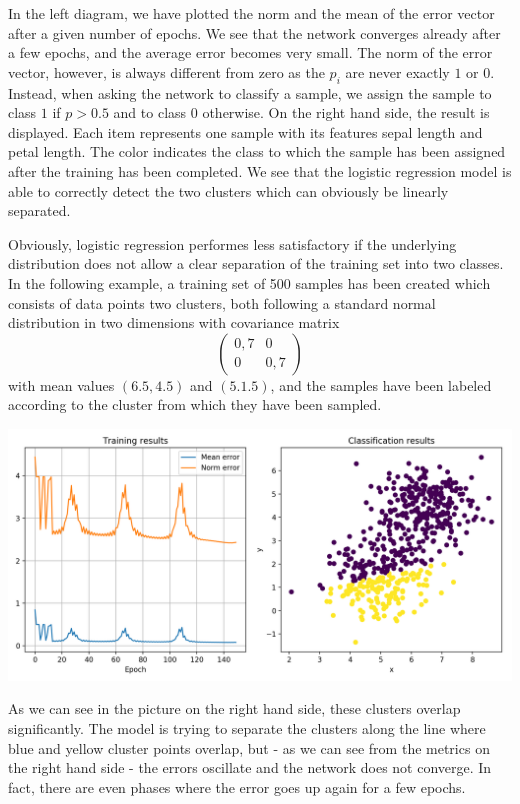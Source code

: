 \documentclass[a4paper, draft]{report}
\numberwithin{section}{chapter}
\numberwithin{equation}{chapter}
\theoremstyle{own}
\theoremstyle{remark}
\begin{document}
In the left diagram, we have plotted the norm and the mean of the error vector after a given number of epochs. We see that the network converges already after a few epochs, and the average error becomes very small. The norm of the error vector, however, is always different from zero
as the $p_i$ are never exactly $1$ or $0$. Instead, when asking the network to classify a sample, we assign the sample to class $1$ if $p > 0.5$ and to class $0$ otherwise. On the right hand side, the result is displayed. Each item represents one sample with its features sepal length and petal length. The color indicates the class to which the sample has been assigned after the training has been completed. We see that the logistic regression model is able to correctly detect the two clusters which can obviously be linearly separated.

Obviously, logistic regression performes less satisfactory if the underlying distribution does not allow a clear separation of the training set into two classes. In the following example, a training set of 500 samples has been created which consists of data points two clusters, both following a standard
normal distribution in two dimensions with covariance matrix
$$
\begin{pmatrix}
0,7 & 0 \\
0 & 0,7
\end{pmatrix}
$$
with mean values $(6.5, 4.5)$ and $(5. 1.5)$, and the samples have been labeled according to the cluster from which they have been sampled.

\includegraphics[scale=0.47]{LogisticRegressionSample.png}

As we can see in the picture on the right hand side, these clusters overlap significantly. The model is trying to separate the clusters along the line where blue and yellow cluster points overlap, but - as we can see from the metrics on the right hand side - the errors oscillate and the network does not converge. In fact, there are even phases where the error goes up again for a few epochs. 
\end{document}
